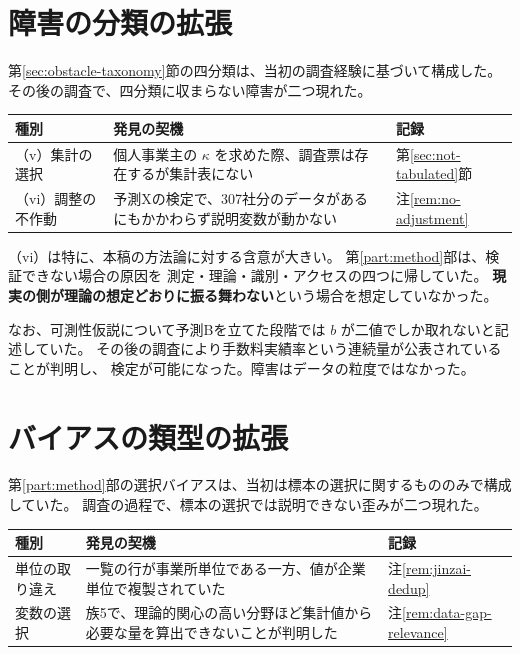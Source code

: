 \section{障害の分類の拡張}

第\ref{sec:obstacle-taxonomy}節の四分類は、当初の調査経験に基づいて構成した。
その後の調査で、四分類に収まらない障害が二つ現れた。

\begin{center}
\begin{tabularx}{\textwidth}{@{}lXl@{}}
\toprule
種別 & 発見の契機 & 記録 \\
\midrule
（v）集計の選択 & 個人事業主の $\kappa$ を求めた際、調査票は存在するが集計表にない & 第\ref{sec:not-tabulated}節 \\
（vi）調整の不作動 & 予測Xの検定で、307社分のデータがあるにもかかわらず説明変数が動かない & 注\ref{rem:no-adjustment} \\
\bottomrule
\end{tabularx}
\label{tab:obstacle-extension}
\end{center}

（vi）は特に、本稿の方法論に対する含意が大きい。
第\ref{part:method}部は、検証できない場合の原因を
測定・理論・識別・アクセスの四つに帰していた。
\textbf{現実の側が理論の想定どおりに振る舞わない}という場合を想定していなかった。

なお、可測性仮説について予測Bを立てた段階では
$b$ が二値でしか取れないと記述していた。
その後の調査により手数料実績率という連続量が公表されていることが判明し、
検定が可能になった。障害はデータの粒度ではなかった。

\section{バイアスの類型の拡張}

第\ref{part:method}部の選択バイアスは、当初は標本の選択に関するもののみで構成していた。
調査の過程で、標本の選択では説明できない歪みが二つ現れた。

\begin{center}
\begin{tabularx}{\textwidth}{@{}lXl@{}}
\toprule
種別 & 発見の契機 & 記録 \\
\midrule
単位の取り違え & 一覧の行が事業所単位である一方、値が企業単位で複製されていた & 注\ref{rem:jinzai-dedup} \\
変数の選択 & 族5で、理論的関心の高い分野ほど集計値から必要な量を算出できないことが判明した & 注\ref{rem:data-gap-relevance} \\
\bottomrule
\end{tabularx}
\label{tab:bias-extension}
\end{center}

